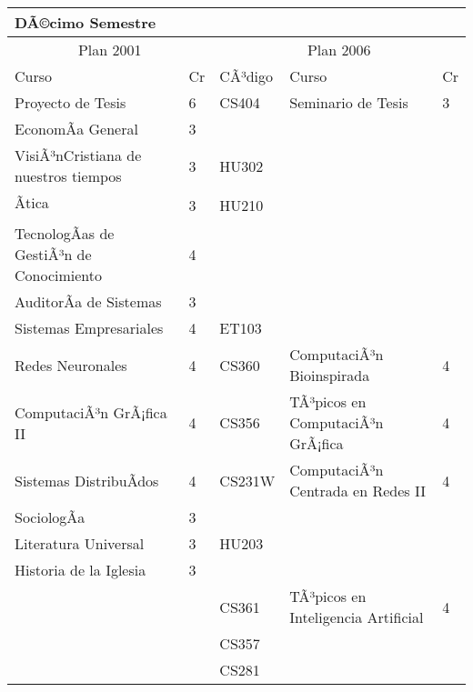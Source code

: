 \begin{center}
\begin{tabularx}{0.95\textwidth}{|p{4cm}|p{1cm}||p{2cm}|X|p{1cm}|}\hline
\multicolumn{5}{|l|}{\textbf{DÃ©cimo Semestre}} \\ \hline
\multicolumn{2}{|c|}{Plan 2001} & \multicolumn{3}{|c|}{Plan 2006} \\ \hline
Curso & Cr & CÃ³digo & Curso & Cr \\ \hline
Proyecto de Tesis & 6 & CS404 & Seminario de Tesis & 3 \\ \hline
EconomÃ­a General & 3 &  &  & \\ \hline
VisiÃ³nCristiana de nuestros tiempos & 3 & HU302 &  & \\ \hline
Ãtica & 3 & HU210 &  & \\ \hline
TecnologÃ­as de GestiÃ³n de Conocimiento & 4 &  &  & \\ \hline
AuditorÃ­a de Sistemas & 3 &  &  & \\ \hline
Sistemas Empresariales & 4 & ET103 &  & \\ \hline
Redes Neuronales & 4 & CS360 & ComputaciÃ³n Bioinspirada & 4 \\ \hline
ComputaciÃ³n GrÃ¡fica II & 4 & CS356 & TÃ³picos en ComputaciÃ³n GrÃ¡fica & 4 \\ \hline
Sistemas DistribuÃ­dos & 4 & CS231W & ComputaciÃ³n Centrada en Redes II & 4 \\ \hline
SociologÃ­a & 3 &  &  & \\ \hline
Literatura Universal & 3 & HU203 &  & \\ \hline
Historia de la Iglesia & 3 &  &  & \\ \hline
 &  & CS361 & TÃ³picos en Inteligencia Artificial & 4 \\ \hline
 &  & CS357 &  & \\ \hline
 &  & CS281 &  & \\ \hline
\end{tabularx}
\end{center}

